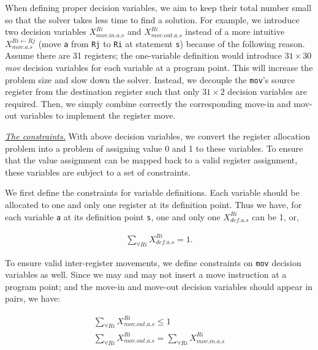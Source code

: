 When defining proper decision variables, we aim to keep their total
number small so that the solver takes less time to find a
solution. For example, we introduce two decision variables
$X_{mov.in.a.s}^{Ri}$ and $X_{mov.out.a.s}^{Ri}$ instead of a more
intuitive $X_{mov.a.s}^{Ri\leftarrow Rj}$ (move {\tt a} from {\tt Rj}
to {\tt Ri} at statement {\tt s}) because of the following reason.
Assume there are 31 registers; the one-variable definition would
introduce $31\times30$ {\em mov} decision variables for each variable
at a program point. This will increase the problem size and slow down
the solver. Instead, we decouple the {\tt mov}'s source register from
the destination register such that only $31\times 2$ decision
variables are required. Then, we simply combine correctly the
corresponding move-in and mov-out variables to implement the register
move.

{\underline{\em The constraints.}}  
With above decision variables, we convert the register allocation
problem into a problem of assigning value 0 and 1 to these
variables. To ensure that the value assignment can be mapped back to a
valid register assignment, these variables are subject to a set of
constraints.

We first define the constraints for variable definitions.  Each
variable should be allocated to one and only one register at its
definition point. Thus we have, for each variable {\tt a} at its
definition point {\tt s}, one and only one $X_{def.a.s}^{Ri}$ can be
1, or,

\begin{small}
\begin{eqnarray}
\sum_{\forall Ri} X_{def.a.s}^{Ri} = 1.
\end{eqnarray}
\end{small}

To ensure valid inter-register movements, we define constraints on
{\tt mov} decision variables as well. Since we may and may not insert
a move instruction at a program point; and the move-in and move-out
decision variables should appear in pairs, we have:

\begin{small}
\begin{eqnarray}
\sum_{\forall Ri} X_{mov.out.a.s}^{Ri} \leq 1  \nonumber \\
\sum_{\forall Ri} X_{mov.out.a.s}^{Ri} = \sum_{\forall Ri} X_{mov.in.a.s}^{Ri}
\end{eqnarray}
\end{small}

